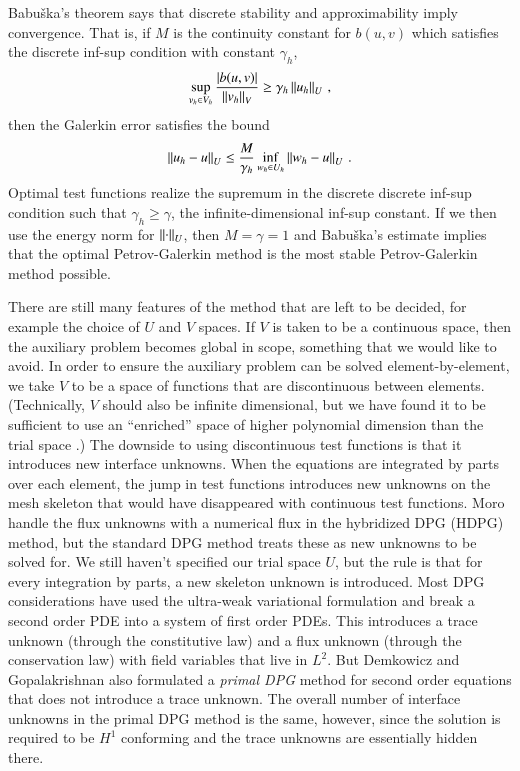 \documentclass[preprint,12pt]{elsarticle}
\begin{document}
Babu\v{s}ka's theorem \cite{Babuska70} says that discrete stability and approximability imply convergence.
That is, if $M$ is the continuity constant for $b(u,v)$ which satisfies the discrete inf-sup condition with constant $\gamma_h$,
\[
\sup_{v_h\in V_h}\frac{|b(u,v)|}{\left\| v_h \right\|_V}\geq\gamma_h\left\| u_h \right\|_U\,,
\]
then the Galerkin error satisfies the bound
\[
\left\| u_h-u \right\|_U\leq\frac{M}{\gamma_h}\inf_{w_h\in U_h}\left\| w_h-u \right\|_U\,.
\]
Optimal test functions realize the supremum in the discrete discrete inf-sup condition such that $\gamma_h\geq\gamma$, 
the infinite-dimensional inf-sup constant.
If we then use the energy norm for $\left\| \cdot \right\|_U$, then $M=\gamma=1$ and Babu\v{s}ka's estimate implies that
the optimal Petrov-Galerkin method is the most stable Petrov-Galerkin method possible.

There are still many features of the method that are left to be decided, for example the choice of $U$ and $V$ spaces.
If $V$ is taken to be a continuous space, then the auxiliary problem becomes global in scope, something that we would like to avoid.
In order to ensure the auxiliary problem can be solved element-by-element, we take $V$ to be a space of functions that are discontinuous between elements.
(Technically, $V$ should also be infinite dimensional, but we have found it to be sufficient to use an ``enriched'' space of higher
polynomial dimension than the trial space \cite{PracticalDPG}.)
The downside to using discontinuous test functions is that it introduces new interface unknowns.
When the equations are integrated by parts over each element, the jump in test functions introduces new unknowns on the mesh skeleton
that would have disappeared with continuous test functions.
Moro \etal \cite{MoroNguyenPeraire11} handle the flux unknowns with a numerical flux in the hybridized DPG (HDPG) method, but the standard DPG method treats
these as new unknowns to be solved for.
We still haven't specified our trial space $U$, but the rule is that for every integration by parts, a new skeleton unknown is introduced.
Most DPG considerations have used the ultra-weak variational formulation and break a second order PDE into 
a system of first order PDEs. 
This introduces a trace unknown (through the constitutive law) and a flux unknown (through the conservation law) with field variables that live in $L^2$.
But Demkowicz and Gopalakrishnan also formulated 
a \emph{primal DPG} method \cite{PrimalDPG} for second order equations that does not introduce a trace unknown.
The overall number of interface unknowns in the primal DPG method is the same, however, since the solution is required to be $H^1$ conforming 
and the trace unknowns are essentially hidden there.
\end{document}
